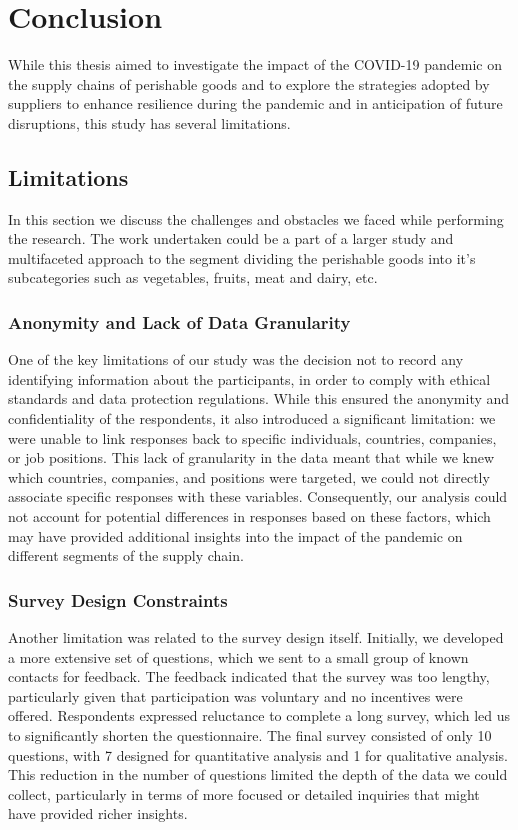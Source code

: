 \chapter{Conclusion}

While this thesis aimed to investigate the impact of the COVID-19 pandemic on the supply chains of perishable goods and to explore the strategies adopted by suppliers to enhance resilience during the pandemic and in anticipation of future disruptions, this study has several limitations.

 

 \section{Limitations}
In this section we discuss the challenges and obstacles we faced while performing the research. The work undertaken could be a part of a larger study and multifaceted approach to the segment dividing the perishable goods into it's subcategories such as vegetables, fruits, meat and dairy, etc.

 \subsection{Anonymity and Lack of Data Granularity}

 One of the key limitations of our study was the decision not to record any identifying information about the participants, in order to comply with ethical standards and data protection regulations. While this ensured the anonymity and confidentiality of the respondents, it also introduced a significant limitation: we were unable to link responses back to specific individuals, countries, companies, or job positions. This lack of granularity in the data meant that while we knew which countries, companies, and positions were targeted, we could not directly associate specific responses with these variables. Consequently, our analysis could not account for potential differences in responses based on these factors, which may have provided additional insights into the impact of the pandemic on different segments of the supply chain. 

 

 \subsection{Survey Design Constraints}

 Another limitation was related to the survey design itself. Initially, we developed a more extensive set of questions, which we sent to a small group of known contacts for feedback. The feedback indicated that the survey was too lengthy, particularly given that participation was voluntary and no incentives were offered. Respondents expressed reluctance to complete a long survey, which led us to significantly shorten the questionnaire. The final survey consisted of only 10 questions, with 7 designed for quantitative analysis and 1 for qualitative analysis. This reduction in the number of questions limited the depth of the data we could collect, particularly in terms of more focused or detailed inquiries that might have provided richer insights. 

